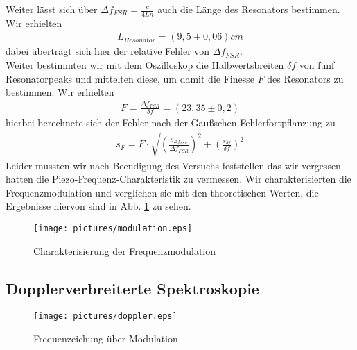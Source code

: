 \documentclass[12pt]{article}
\begin{document}
Weiter lässt sich über $\Delta f_{FSR} = \frac{c}{4Ln}$ auch die Länge des Resonators bestimmen. Wir erhielten
\begin{align*}
 L_{Resonator}= (9,5 \pm 0,06) cm
\end{align*}
dabei überträgt sich hier der relative Fehler von $\Delta f_{FSR}$.  \\
Weiter bestimmten wir mit dem Oszilloskop die Halbwertsbreiten $\delta f$ von fünf Resonatorpeaks und mittelten diese, um damit die Finesse $F$ des Resonators zu bestimmen. Wir erhielten 
\begin{align*}
 F = \frac{\Delta f_{FSR}}{\delta f} = ( 23,35 \pm 0,2 )
\end{align*}
hierbei berechnete sich der Fehler nach der Gaußschen Fehlerfortpflanzung zu
\begin{align*}
 s_F = F \cdot \sqrt{ \left( \frac{s_{\Delta f_{FSR}}}{\Delta f_{FSR}} \right)^2 + \left( \frac{s_{\delta f}}{\delta f} \right)^2}
\end{align*}
Leider mussten wir nach Beendigung des Versuchs feststellen das wir vergessen hatten die Piezo-Frequenz-Charakteristik zu vermessen. 
Wir charakterisierten die Frequenzmodulation und verglichen sie mit den theoretischen Werten, die Ergebnisse hiervon sind in Abb. \ref{bessel} zu sehen.
\begin{figure}[H]
 \texttt{[image: pictures/modulation.eps]}
 \caption{Charakterisierung der Frequenzmodulation}
 \label{bessel}
\end{figure}

\subsection{Dopplerverbreiterte Spektroskopie}
\begin{figure}[H]
 \texttt{[image: pictures/doppler.eps]}
 \caption{Frequenzeichung über Modulation}
 \label{doppler}
\end{figure}
\end{document}
